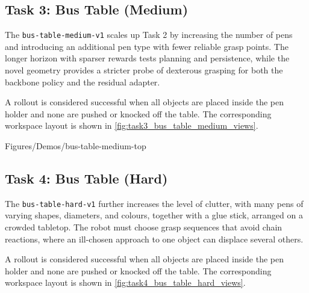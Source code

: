 \subsection{Task 3: Bus Table (Medium)}
\label{sec:task:bus_table_medium}

The \texttt{bus-table-medium-v1} scales up Task 2 by increasing the number of pens and introducing an additional pen type with fewer reliable grasp points. The longer horizon with sparser rewards tests planning and persistence, while the novel geometry provides a stricter probe of dexterous grasping for both the backbone policy and the residual adapter.

A rollout is considered successful when all objects are placed inside the pen holder and none are pushed or knocked off the table. The corresponding workspace layout is shown in \cref{fig:task3_bus_table_medium_views}.

{Figures/Demos/bus-table-medium-top}

\subsection{Task 4: Bus Table (Hard)}
\label{sec:task:bus_table_hard}

The \texttt{bus-table-hard-v1} further increases the level of clutter, with many pens of varying shapes, diameters, and colours, together with a glue stick, arranged on a crowded tabletop. The robot must choose grasp sequences that avoid chain reactions, where an ill-chosen approach to one object can displace several others.

A rollout is considered successful when all objects are placed inside the pen holder and none are pushed or knocked off the table. The corresponding workspace layout is shown in \cref{fig:task4_bus_table_hard_views}.

